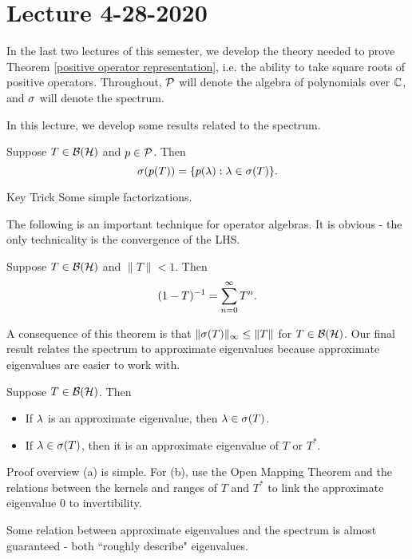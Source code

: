 \section{Lecture 4-28-2020}
In the last two lectures of this semester, we develop the theory needed to prove Theorem \ref{positive operator representation}, i.e. the ability to take square roots of positive operators. Throughout, ${\mathcal P}$ will denote the algebra of polynomials over ${\mathbb C}$, and $\sigma$ will denote the spectrum.

In this lecture, we develop some results related to the spectrum.

\begin{thm}
    Suppose $T \in {\mathcal B}({\mathcal H})$ and $p \in {\mathcal P}$. Then
    \[
        \sigma(p(T)) = \{p(\lambda): \lambda \in \sigma(T)\}.
    \]
\end{thm}
\begin{details}{Key Trick}
    Some simple factorizations.
\end{details}

The following is an important technique for operator algebras. It is obvious - the only technicality is the convergence of the LHS.

\begin{thm}
    Suppose $T \in {\mathcal B}({\mathcal H})$ and $\|T\| < 1$. Then
    \[
        (1 - T)^{-1} = \sum_{n = 0}^\infty T^n.
    \]
\end{thm}

A consequence of this theorem is that $\|\sigma(T)\|_\infty \leq \|T\|$ for $T \in {\mathcal B}({\mathcal H})$. Our final result relates the spectrum to approximate eigenvalues because approximate eigenvalues are easier to work with.

\begin{thm}
    Suppose $T \in {\mathcal B}({\mathcal H})$. Then
    \begin{itemize}
        \item[(a)] If $\lambda$ is an approximate eigenvalue, then $\lambda \in \sigma(T)$.
        \item[(b)] If $\lambda \in \sigma(T)$, then it is an approximate eigenvalue of $T$ or $T^*$.
    \end{itemize}
\end{thm}
\begin{details}{Proof overview}
    (a) is simple. For (b), use the Open Mapping Theorem and the relations between the kernels and ranges of $T$ and $T^*$ to link the approximate eigenvalue 0 to invertibility.
\end{details}
\begin{remark}
    Some relation between approximate eigenvalues and the spectrum is almost guaranteed - both ``roughly describe" eigenvalues.
\end{remark}
